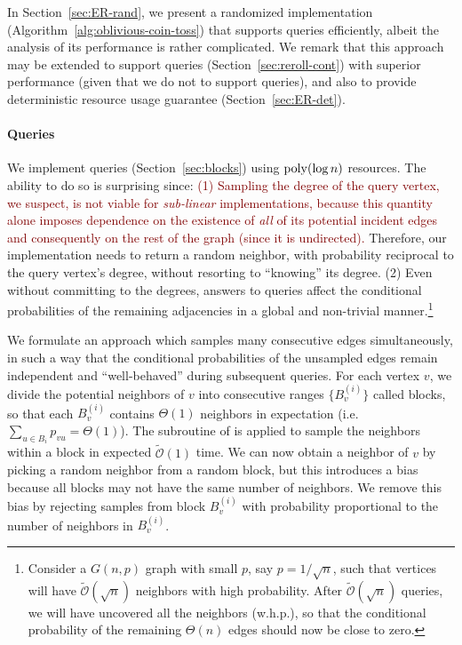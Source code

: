 In Section~\ref{sec:ER-rand}, we present a randomized implementation (Algorithm~\ref{alg:oblivious-coin-toss})
that supports  queries efficiently, albeit the analysis of its performance is rather complicated.
We remark that this approach may be extended to support  queries (Section~\ref{sec:reroll-cont}) with superior performance
(given that we do not to support  queries),
and also to provide deterministic resource usage guarantee (Section~\ref{sec:ER-det}).


\paragraph*{ Queries}
\label{par:random_neighbor_queries}
We implement  queries (Section~\ref{sec:blocks}) using $\mathrm{poly}(\log n)$ resources.
The ability to do so is surprising since:
\textcolor{Maroon}{
(1) Sampling the degree of the query vertex, we suspect, is not viable for \emph{sub-linear} implementations, because this quantity alone
imposes dependence on the existence of \emph{all} of its potential incident edges and consequently on the rest of the graph (since it is undirected).}
Therefore, our implementation needs to return a random neighbor, with probability reciprocal to the query vertex's degree,
without resorting to ``knowing'' its degree.
(2) Even without committing to the degrees, answers to  queries
affect the conditional probabilities of the remaining adjacencies in a global and non-trivial manner.\footnote{
\label{conditional} Consider a $G(n,p)$ graph with small $p$, say $p = 1/\sqrt n$,
such that vertices will have $\widetilde{\mathcal{O}}(\sqrt n)$ neighbors with high probability.
After $\widetilde{\mathcal{O}}(\sqrt n)$  queries, we will have uncovered all the neighbors (w.h.p.),
so that the conditional probability of the remaining $\Theta(n)$ edges should now be close to zero.}

We formulate an approach which samples many consecutive edges simultaneously,
in such a way that the conditional probabilities of the unsampled edges remain independent and ``well-behaved'' during subsequent queries.
For each vertex $v$, we divide the potential neighbors of $v$ into consecutive ranges $\{B^{(i)}_v\}$ called blocks,
so that each $B^{(i)}_v$ contains $\Theta(1)$ neighbors in expectation (i.e. $\sum_{u\in B_i} p_{vu} = \Theta(1)$).
The subroutine of  is applied to sample the neighbors within a block in expected $\mathcal{\widetilde O}(1)$ time.
We can now obtain a neighbor of $v$ by picking a random neighbor from a random block,
but this introduces a bias because all blocks may not have the same number of neighbors.
We remove this bias by rejecting samples from block $B^{(i)}_v$ with probability proportional to the number of neighbors in $B^{(i)}_v$.




